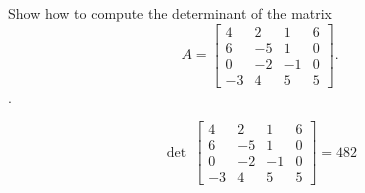 
\begin{exerciseStatement}


Show how to compute the determinant of the matrix \[A= \left[\begin{array}{cccc}
4 & 2 & 1 & 6 \\
6 & -5 & 1 & 0 \\
0 & -2 & -1 & 0 \\
-3 & 4 & 5 & 5
\end{array}\right] .\].


\end{exerciseStatement}
    
\begin{exerciseAnswer} 
\[\operatorname{det}\  \left[\begin{array}{cccc}
4 & 2 & 1 & 6 \\
6 & -5 & 1 & 0 \\
0 & -2 & -1 & 0 \\
-3 & 4 & 5 & 5
\end{array}\right] = 482 \]
\end{exerciseAnswer}
    
